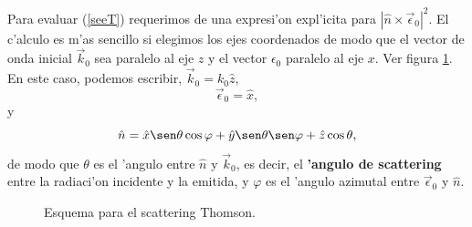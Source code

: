 Para evaluar (\ref{seeT}) requerimos de una expresi'on expl'icita para
$\left|\hat{n}\times\vec{\epsilon}_0\right|^2$. El c'alculo es m'as sencillo si elegimos los ejes coordenados de modo que el vector de onda inicial $\vec{k}_0$ sea paralelo al eje $z$ y el vector $\epsilon_0$ paralelo al eje $x$. Ver figura \ref{fig:thomson}. En este caso, podemos escribir, $\vec{k}_0=k_0\hat{z}$, 
\begin{equation}\label{epsilon0}
\vec\epsilon_0=\hat{x},
\end{equation}
y 
\begin{equation}
\hat{n}=\hat{x}\sen\theta\cos\varphi + \hat{y}\sen\theta\sen\varphi +\hat{z}\cos\theta, \label{ene}
\end{equation}
de modo que $\theta$ es el 'angulo entre $\hat{n}$ y $\vec{k}_0$, es decir, el
\textbf{'angulo de scattering} entre la radiaci'on incidente y la emitida, y $\varphi$ es el 'angulo azimutal entre $\vec{\epsilon}_0$ y
$\hat{n}$.
\begin{figure}[H]
\centerline{}
 \caption{Esquema para el scattering Thomson.}
\label{fig:thomson}
\end{figure}
